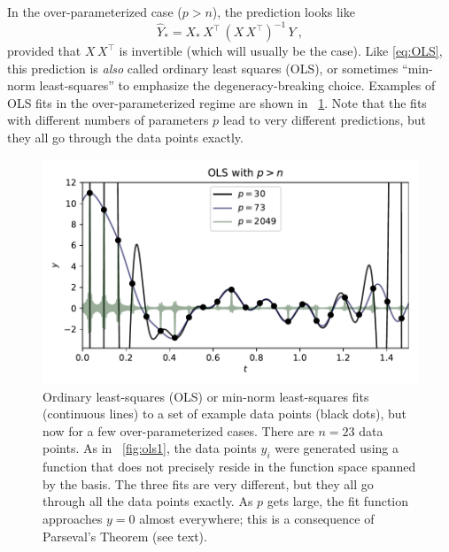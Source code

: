\documentclass[12pt,letterpaper]{article}
\newlength{\figurewidth}
\begin{document}
In the over-parameterized case ($p>n$), the prediction looks like
\begin{equation}\label{eq:OLS2}
    \hat{Y}_\ast = X_\ast\,X^\top\,(X\,X^\top)^{-1}\,Y
    ~,
\end{equation}
provided that $X\,X^\top$ is invertible (which will usually be the case).
Like \eqref{eq:OLS}, this prediction is \emph{also} called ordinary least squares (OLS), or sometimes ``min-norm least-squares'' to emphasize the degeneracy-breaking choice.
Examples of OLS fits in the over-parameterized regime are shown in \figurename~\ref{fig:ols2}.
Note that the fits with different numbers of parameters $p$ lead to very different predictions, but they all go through the data points exactly.
\begin{figure}[t]
    \begin{mdframed}
    \includegraphics[width=\figurewidth]{paper/OLS-over.pdf}
    \caption{Ordinary least-squares (OLS) or min-norm least-squares fits (continuous lines) to a set of example data points (black dots), but now for a few over-parameterized cases. There are $n=23$ data points. As in \figurename~\ref{fig:ols1}, the data points $y_i$ were generated using a function that does not precisely reside in the function space spanned by the basis. The three fits are very different, but they all go through all the data points exactly. As $p$ gets large, the fit function approaches $y=0$ almost everywhere; this is a consequence of Parseval's Theorem (see text).}
    \label{fig:ols2}
    \end{mdframed}
\end{figure}
\end{document}
